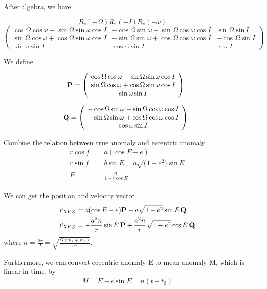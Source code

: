 \documentclass[12pt]{article}
\begin{document}
After algebra, we have 

\[ R_{z}(-\Omega)R_{x}(-I)R_{z}(-\omega) =      \]
\[ \left ( \begin{array}{ccc}
 \cos \Omega \cos \omega -\sin \Omega \sin \omega \cos I & -\cos \Omega \sin \omega- \sin \Omega \cos \omega \cos I & \sin \Omega \sin I   \\
 \sin \Omega \cos \omega +\cos \Omega \sin \omega \cos I& -\sin \Omega \sin \omega+\cos \Omega \cos\omega\cos I& -\cos\Omega\sin I \\
\sin \omega \sin I& \cos \omega \sin I& \cos I \end{array} \right )\ \]

We define 

\[ {\bf P}=   \left ( \begin{array}{ccc}
 \cos \Omega \cos \omega -\sin \Omega \sin \omega \cos I  \\
 \sin \Omega \cos \omega +\cos \Omega \sin \omega \cos I \\
\sin \omega \sin I  \end{array} \right )\ \]

\[ {\bf Q}=   \left ( \begin{array}{ccc}
 -\cos \Omega \sin \omega- \sin \Omega \cos \omega \cos I \\
 -\sin \Omega \sin \omega+\cos \Omega \cos\omega\cos I \\
\cos \omega \sin I  \end{array} \right )\ \]

Combine the relation between true anomaly and eccentric anomaly
\begin{align} 
r\cos f&=a(\cos E-e)\\
r\sin f&= b\sin E=a\sqrt(1-e^{2})\sin E\\
\dot{E}&=\frac{n}{1-e\cos E}\\
\end{align}

We can get the position and velocity vector
\begin{align} 
\vec{r}_{XYZ}&=a(\cos E -e) {\bf P}+a\sqrt{1-e^{2}}\sin E\,  {\bf Q} \\
\vec{v}_{XYZ}&=-\frac{a^{2}n}{r}\sin E\,  {\bf P}+\frac{a^{2}n}{r}\sqrt{1-e^{2}}\cos E\,  {\bf Q}
\end{align}
where $n=\frac{2\pi}{T}=\sqrt{\frac{G(m_{1}+m_{2})}{a^{3}}}$.


Furthermore, we can convert eccentric anomaly E to mean anomaly M, which is linear in time, by
\begin{align} 
M=E-e\sin E=n(t-t_{0})
\end{align}
\end{document}
